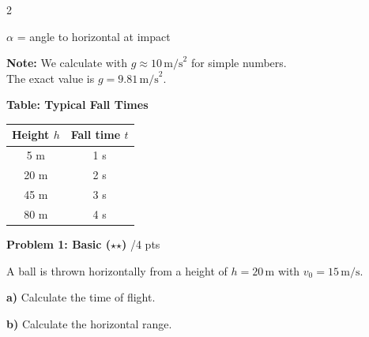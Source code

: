\documentclass[10pt, a4paper]{article}
\newcommand{\fachfarbe}{physik}
\newcommand{\stmark}{$\star$}
\newcommand{\abschnitt}[1]{%
    \vspace{8pt}
    \noindent\textbf{\textcolor{\fachfarbe}{#1}}
    \vspace{4pt}
}
\newcommand{\punkte}[1]{\hfill\small\textcolor{grau}{/#1 pts}}
\begin{document}
\begin{multicols}{2}
\begin{formelbox}
\vspace{2pt}
\footnotesize
$\alpha$ = angle to horizontal at impact
\end{formelbox}

\vspace{4pt}

\begin{hinweisbox}
\footnotesize
\textbf{Note:} We calculate with $g \approx 10\,\text{m/s}^2$ for simple numbers.\\
The exact value is $g = 9.81\,\text{m/s}^2$.
\end{hinweisbox}


\columnbreak


\abschnitt{Table: Typical Fall Times}

\begin{center}
\begin{tabular}{|c|c|}
\hline
\textbf{Height $h$} & \textbf{Fall time $t$} \\
\hline
5 m & 1 s \\
\hline
20 m & 2 s \\
\hline
45 m & 3 s \\
\hline
80 m & 4 s \\
\hline
\end{tabular}
\end{center}

\vspace{2pt}


\abschnitt{Problem 1: Basic (\stmark\stmark)}\punkte{4}

A ball is thrown horizontally from a height of $h = 20\,\text{m}$ with $v_0 = 15\,\text{m/s}$.

\textbf{a)} Calculate the time of flight.

\vspace{1.8cm}

\textbf{b)} Calculate the horizontal range.

\vspace{1.8cm}


\end{multicols}
\end{document}
